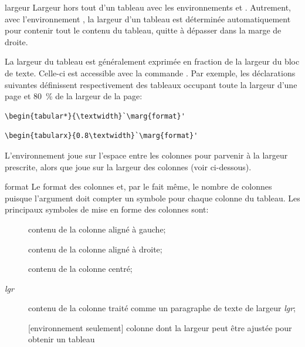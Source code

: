 \begin{list}{}{%
    \setlength{\labelsep}{1.5ex}
    \setlength{\leftmargin}{\labelwidth}
    \addtolength{\leftmargin}{\labelsep}
    \setlength{\parsep}{0.5ex plus0.2ex minus0.2ex}
    \setlength{\itemsep}{0.3ex}
    \renewcommand{\makelabel}[1]{\meta{#1}\hfill}}
%
\item[largeur] Largeur hors tout d'un tableau avec les
  environnements  et . Autrement,
  avec l'environnement , la largeur d'un tableau est
  déterminée automatiquement pour contenir tout le contenu du tableau,
  quitte à dépasser dans la marge de droite.

  La largeur du tableau est généralement exprimée en fraction de la
  largeur du bloc de texte. Celle-ci est accessible avec la commande
  . Par exemple, les déclarations suivantes
  définissent respectivement des tableaux occupant toute la largeur
  d'une page et 80~\% de la largeur de la page:
\begin{lstlisting}
\begin{tabular*}{\textwidth}`\marg{format}'
\end{lstlisting}
\begin{lstlisting}
\begin{tabularx}{0.8\textwidth}`\marg{format}'
\end{lstlisting}
  L'environnement  joue sur l'espace entre les colonnes
  pour parvenir à la largeur prescrite, alors que  joue
  sur la largeur des colonnes (voir ci-dessous).
\item[format] Le format des colonnes et, par le fait même, le nombre
  de colonnes puisque l'argument doit compter un symbole pour chaque
  colonne du tableau. Les principaux symboles de mise en forme des
  colonnes sont:
  \begin{description}
  \item[\normalfont{}] contenu de la colonne aligné à gauche;
  \item[\normalfont{}] contenu de la colonne aligné à droite;
  \item[\normalfont{}] contenu de la colonne centré;
  \item[\normalfont{}\textit{lgr}\code{\}}] contenu de la colonne traité comme un
    paragraphe de texte de largeur \textit{lgr};
  \item[\normalfont{}] [environnement  seulement]
    colonne dont la largeur peut être ajustée pour obtenir un tableau

\end{description}
\end{list}
